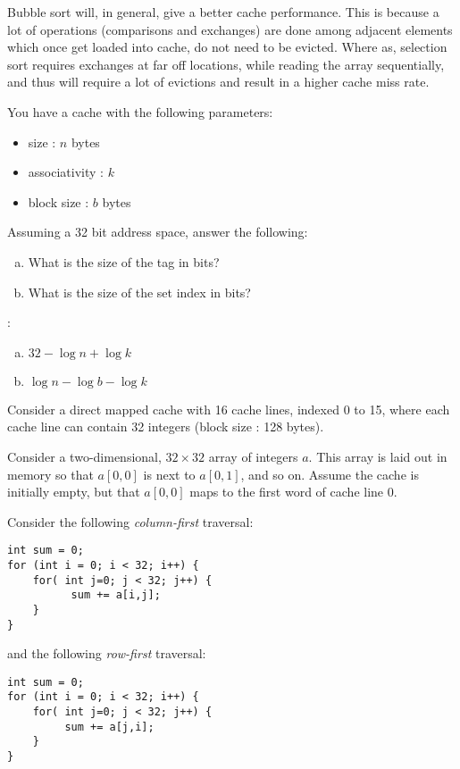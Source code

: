 \begin{ExerciseList}
\Answer Bubble sort will, in general, give a better cache performance. This is because a lot of operations (comparisons
and exchanges) are done among adjacent elements which once get loaded into cache, do not need to be evicted. Where as,
selection sort requires exchanges at far off locations, while reading the array sequentially, and thus will require a
lot of evictions and result in a higher cache miss rate.


\Exercise
You have a cache with the following parameters:
\begin{itemize}
\item size : $n$ bytes
\item associativity : $k$
\item block size : $b$ bytes
\end{itemize}
Assuming a 32 bit address space, answer the following:

\begin{enumerate}[(a) ]
\item What is the size of the tag in bits? 
\item What is the size of the set index in bits? 
\end{enumerate}

\Answer:
\begin{enumerate}[(a) ]
\item $32-\log n +\log k$
\item $\log n -\log b -\log k $
\end{enumerate}


\Exercise[difficulty=1]
Consider a direct mapped cache with 16 cache lines, indexed 0 to 15,
where each cache line can contain 32 integers (block size : 128 bytes). 

Consider a two-dimensional, $32 \times 32$ array of integers $a$. This array is laid
out in memory so that $a[0,0]$ is next to $a[0,1]$, and so on. Assume the cache is 
initially empty, but that $a[0,0]$ maps to the first word of cache line 0. 

Consider the following {\em column-first} traversal: 

\begin{Verbatim}[frame=single]
int sum = 0;
for (int i = 0; i < 32; i++) {
    for( int j=0; j < 32; j++) {
          sum += a[i,j]; 
    }
}
\end{Verbatim}

and the following {\em row-first} traversal: 

\begin{Verbatim}[frame=single]
int sum = 0;
for (int i = 0; i < 32; i++) {
    for( int j=0; j < 32; j++) {
         sum += a[j,i]; 
    }
}
\end{Verbatim}


\end{ExerciseList}
